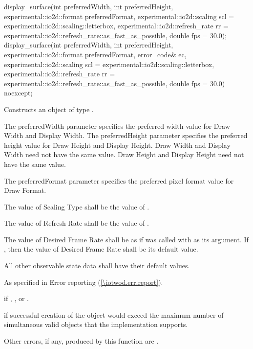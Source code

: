 \begin{itemdecl}
display_surface(int preferredWidth, int preferredHeight, 
  experimental::io2d::format preferredFormat,
  experimental::io2d::scaling scl = experimental::io2d::scaling::letterbox,
  experimental::io2d::refresh_rate rr =
  experimental::io2d::refresh_rate::as_fast_as_possible, double fps = 30.0);
display_surface(int preferredWidth, int preferredHeight, 
  experimental::io2d::format preferredFormat, error_code& ec,
  experimental::io2d::scaling scl = experimental::io2d::scaling::letterbox,
    experimental::io2d::refresh_rate rr =
    experimental::io2d::refresh_rate::as_fast_as_possible, double fps = 30.0)
  noexcept;
\end{itemdecl}
\begin{itemdescr}
\pnum
\effects
Constructs an object of type .

\pnum
The preferredWidth parameter specifies the preferred width value for Draw Width and Display Width. The preferredHeight parameter specifies the preferred height value for Draw Height and Display Height. Draw Width and Display Width need not have the same value. Draw Height and Display Height need not have the same value.

\pnum
The preferredFormat parameter specifies the preferred pixel format value for Draw Format.

\pnum
The value of Scaling Type shall be the value of .

\pnum
The value of Refresh Rate shall be the value of .

\pnum
The value of Desired Frame Rate shall be as if  was called with  as its argument. If , then the value of Desired Frame Rate shall be its default value.

\pnum
All other observable state data shall have their default values.

\pnum
\throws
As specified in Error reporting (\ref{\iotwod.err.report}).

\pnum
\errors
{} if , , or .

 if successful creation of the  object would exceed the maximum number of simultaneous valid  objects that the implementation supports.

\pnum
Other errors, if any, produced by this function are .
\end{itemdescr}

